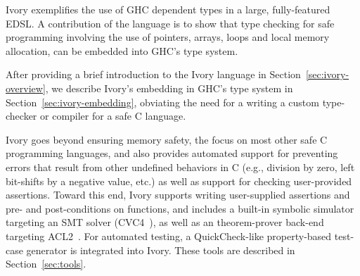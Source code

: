 Ivory exemplifies the use of GHC dependent types in a large, fully-featured
EDSL. A contribution of the language is to show that type checking for safe
programming involving the use of pointers, arrays, loops and local memory
allocation, can be embedded into GHC's type system.

After providing a brief introduction to the Ivory language in
Section~\ref{sec:ivory-overview}, we describe Ivory's embedding in GHC's type
system in Section~\ref{sec:ivory-embedding}, obviating the need for a writing a
custom type-checker or compiler for a safe C language.

Ivory goes beyond ensuring memory safety, the focus on most other safe C
programming languages, and also provides automated support for preventing errors
that result from other undefined behaviors in C (e.g., division by zero, left
bit-shifts by a negative value, etc.) as well as support for checking
user-provided assertions. Toward this end, Ivory supports writing user-supplied
assertions and pre- and post-conditions on functions, and includes a built-in
symbolic simulator targeting an SMT solver (CVC4~\cite{}), as well as an
theorem-prover back-end targeting ACL2~\cite{}. For automated testing, a
QuickCheck-like property-based test-case generator is integrated into
Ivory. These tools are described in Section~\ref{sec:tools}.




